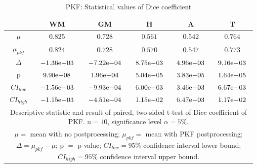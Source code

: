 \documentclass[journal]{IEEEtran}
\begin{document}
\begin{table}[ht]
\renewcommand{\arraystretch}{1.4}
\caption{PKF: Statistical values of Dice coefficient}
\label{tbl_pkf_dice}
\centering
\tabcolsep=0.11cm
\begin{tabular}{c|c|c|c|c|c}
\hline
 & WM & GM & H & A & T\\
\hline
$\mu$&$0.825$&$0.728$&$0.561$&$0.542$&$0.764$\\
$\mu_{pkf}$&$0.824$&$0.728$&$0.570$&$0.547$&$0.773$\\
$\Delta$&${-1.36}\mathrm{e}{-03}$&${-7.22}\mathrm{e}{-04}$&${8.75}\mathrm{e}{-03}$&${4.96}\mathrm{e}{-03}$&$9{.16}\mathrm{e}{-03}$\\
p&$	{9.90}\mathrm{e}{-08}$&${1.96}\mathrm{e}{-04}$&${5.04}\mathrm{e}{-05}$&$	{3.83}\mathrm{e}{-05}$&${1.64}\mathrm{e}{-05}$\\
$CI_{low}$&${-1.56}\mathrm{e}{-03}$&${-9.93}\mathrm{e}{-04}$&${6.00}\mathrm{e}{-03}$&$	{3.46}\mathrm{e}{-03}$&${6.67}\mathrm{e}{-03}$\\
$CI_{high}$&$	{-1.15}\mathrm{e}{-03}$&${-4.51}\mathrm{e}{-04}$&${1.15}\mathrm{e}{-02}$&$	{6.47}\mathrm{e}{-03}$&${1.17}\mathrm{e}{-02}$\\
\hline
\multicolumn{6}{p{3.4in}}{Descriptive statistic and result of paired, two-sided t-test of Dice coefficient of PKF. $n=10$, significance level $\alpha = 5\%$. }\\
\multicolumn{6}{p{3.4in}}{$\mu=$ mean with no postprocessing; $\mu_{pkf}=$ mean with PKF postprocessing; $\Delta=\mu_{pkf}-\mu$; p $=$ p-value;  $CI_{low}= 95\%$ confidence interval lower bound; $CI_{high}= 95\%$ confidence interval upper bound.}\\

\end{tabular}
\end{table}
\end{document}
